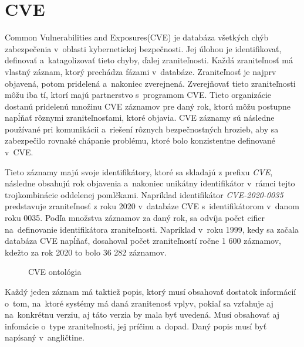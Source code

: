 \documentclass[12pt, a4paper, oneside]{book}
\begin{document}
\section{CVE}
Common Vulnerabilities and Exposures(CVE) \citep{cve} je databáza všetkých chýb zabezpečenia v~oblasti kybernetickej bezpečnosti. Jej úlohou je identifikovať, definovať a~katagolizovať tieto chyby, ďalej zraniteľnosti. Každá zraniteľnosť má vlastný záznam, ktorý prechádza fázami v~databáze. Zraniteľnosť je najprv objavená, potom pridelená a~nakoniec zverejnená. Zverejňovať tieto zraniteľnosti môžu iba tí, ktorí majú partnerstvo s~programom CVE. Tieto organizácie dostanú pridelenú množinu CVE záznamov pre daný rok, ktorú môžu postupne napĺňať rôznymi zraniteľnosťami, ktoré objavia. CVE záznamy sú následne používané pri komunikácii a~riešení rôznych bezpečnostných hrozieb, aby sa zabezpečilo rovnaké chápanie problému, ktoré bolo konzistentne definované v~CVE.  


Tieto záznamy majú svoje identifikátory, ktoré sa skladajú z prefixu \textit{CVE}, následne obsahujú rok objavenia a~nakoniec unikátny identifikátor v~rámci tejto trojkombinácie oddelenej pomlčkami. Napríklad identifikátor \textit{CVE-2020-0035} predstavuje  zraniteľnosť z roku 2020 v~databáze CVE s~identifikátorom v~danom roku 0035. Podľa množstva záznamov za daný rok, sa odvíja počet cifier na~definovanie identifikátora zraniteľnosti. Napríklad v~roku 1999, kedy sa začala databáza CVE napĺňať, dosahoval počet zraniteľností ročne 1 600 záznamov, kdežto za rok 2020 to bolo 36 282 záznamov.


\begin{figure}[!hb]
\label{fig:cveOnto}
\caption{CVE ontológia}
\end{figure}


Každý jeden záznam má taktiež popis, ktorý musí obsahovať dostatok informácií o~tom, na~ktoré systémy má daná zranitenosť vplyv, pokiaľ sa vzťahuje aj na~konkrétnu verziu, aj táto verzia by mala byť uvedená. Musí obsahovať aj infomácie o~type zraniteľnosti, jej príčinu a~dopad. Daný popis musí byť napísaný v~angličtine.
\end{document}
